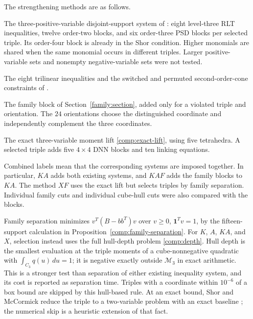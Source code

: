 The strengthening methods are as follows.
\begin{description}[leftmargin=2.7em,labelwidth=2.1em]
\item[$K$] The three-positive-variable disjoint-support system of
\citet[eq.~(17)]{Khajavirad2026SparseBoxQP}: eight level-three RLT
inequalities, twelve order-two blocks, and six order-three PSD blocks
per selected triple. Its order-four block is already in the Shor
condition. Higher monomials are shared when the same monomial occurs in
different triples. Larger positive-variable sets and nonempty
negative-variable sets were not tested.
\item[$A$] The eight trilinear inequalities and the switched and permuted
second-order-cone constraints of
\citet[eqs.~(14)--(16)]{AnstreicherPuges2025ETRI}.
\item[$F$] The family block of Section~\ref{family:section}, added only
for a violated triple and orientation. The $24$ orientations choose
the distinguished coordinate and independently complement the three
coordinates.
\item[$X$] The exact three-variable moment lift
\eqref{comp:exact-lift}, using five tetrahedra. A selected triple adds
five $4\times4$ DNN blocks and ten linking equations.
\end{description}
Combined labels mean that the corresponding systems are imposed together.
In particular, $KA$ adds both existing systems, and $KAF$ adds the
family blocks to $KA$. The method $XF$ uses the exact lift but selects
triples by family separation. Individual family cuts and individual
cube-hull cuts were also compared with the blocks.

Family separation minimizes $v^T(B-bb^T)v$ over $v\geq0$,
$\mathbf1^Tv=1$, by the fifteen-support calculation in
Proposition~\ref{comp:family-separation}. For $K$, $A$, $KA$, and $X$,
selection instead uses the full hull-depth problem
\eqref{comp:depth}. Hull depth is the smallest evaluation at the triple
moments of a cube-nonnegative quadratic with $\int_{C_3}q(u)\,du=1$;
it is negative exactly outside $\mathcal M_3$ in exact arithmetic.
This is a stronger test than separation of either
existing inequality system, and its cost is reported as separation time.
Triples with a coordinate within $10^{-6}$ of a box bound are skipped
by this hull-based rule. At an exact bound, Shor and McCormick reduce the
triple to a two-variable problem with an exact baseline
\citep[Theorem~6]{AnstreicherBurer2010}; the numerical
skip is a heuristic extension of that fact.

